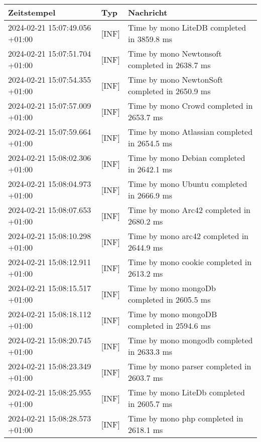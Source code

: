         {
            {\small
                \begin{tabularx}{\textwidth}{|l|l|X|}
                    \hline
                    \textbf{Zeitstempel} & \textbf{Typ} & \textbf{Nachricht} \\
                    \hline
                    \endhead
                    2024-02-21 15:07:49.056 +01:00 & [INF] & Time by mono LiteDB completed in 3859.8 ms \\
                    2024-02-21 15:07:51.704 +01:00 & [INF] & Time by mono Newtonsoft completed in 2638.7 ms \\
                    2024-02-21 15:07:54.355 +01:00 & [INF] & Time by mono NewtonSoft completed in 2650.9 ms \\
                    2024-02-21 15:07:57.009 +01:00 & [INF] & Time by mono Crowd completed in 2653.7 ms \\
                    2024-02-21 15:07:59.664 +01:00 & [INF] & Time by mono Atlassian completed in 2654.5 ms \\
                    2024-02-21 15:08:02.306 +01:00 & [INF] & Time by mono Debian completed in 2642.1 ms \\
                    2024-02-21 15:08:04.973 +01:00 & [INF] & Time by mono Ubuntu completed in 2666.9 ms \\
                    2024-02-21 15:08:07.653 +01:00 & [INF] & Time by mono Arc42 completed in 2680.2 ms \\
                    2024-02-21 15:08:10.298 +01:00 & [INF] & Time by mono arc42 completed in 2644.9 ms \\
                    2024-02-21 15:08:12.911 +01:00 & [INF] & Time by mono cookie completed in 2613.2 ms \\
                    2024-02-21 15:08:15.517 +01:00 & [INF] & Time by mono mongoDb completed in 2605.5 ms \\
                    2024-02-21 15:08:18.112 +01:00 & [INF] & Time by mono mongoDB completed in 2594.6 ms \\
                    2024-02-21 15:08:20.745 +01:00 & [INF] & Time by mono mongodb completed in 2633.3 ms \\
                    2024-02-21 15:08:23.349 +01:00 & [INF] & Time by mono parser completed in 2603.7 ms \\
                    2024-02-21 15:08:25.955 +01:00 & [INF] & Time by mono LiteDb completed in 2605.7 ms \\
                    2024-02-21 15:08:28.573 +01:00 & [INF] & Time by mono php completed in 2618.1 ms \\

\end{tabularx}}}
